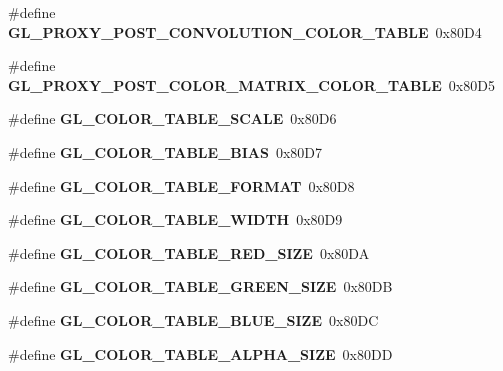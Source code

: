\begin{DoxyCompactItemize}
\item 
\#define {\bfseries G\+L\+\_\+\+P\+R\+O\+X\+Y\+\_\+\+P\+O\+S\+T\+\_\+\+C\+O\+N\+V\+O\+L\+U\+T\+I\+O\+N\+\_\+\+C\+O\+L\+O\+R\+\_\+\+T\+A\+B\+L\+E}~0x80\+D4\label{_s_d_l__opengl_8h_aea3b3835746e512db9dd4d8faa53802d}

\item 
\#define {\bfseries G\+L\+\_\+\+P\+R\+O\+X\+Y\+\_\+\+P\+O\+S\+T\+\_\+\+C\+O\+L\+O\+R\+\_\+\+M\+A\+T\+R\+I\+X\+\_\+\+C\+O\+L\+O\+R\+\_\+\+T\+A\+B\+L\+E}~0x80\+D5\label{_s_d_l__opengl_8h_a1fd5301bba01002fbdc77099780c6e56}

\item 
\#define {\bfseries G\+L\+\_\+\+C\+O\+L\+O\+R\+\_\+\+T\+A\+B\+L\+E\+\_\+\+S\+C\+A\+L\+E}~0x80\+D6\label{_s_d_l__opengl_8h_aec92579e9017715501644fa75665b1b2}

\item 
\#define {\bfseries G\+L\+\_\+\+C\+O\+L\+O\+R\+\_\+\+T\+A\+B\+L\+E\+\_\+\+B\+I\+A\+S}~0x80\+D7\label{_s_d_l__opengl_8h_a32cd65a4ace7f64260fbec54c818d3db}

\item 
\#define {\bfseries G\+L\+\_\+\+C\+O\+L\+O\+R\+\_\+\+T\+A\+B\+L\+E\+\_\+\+F\+O\+R\+M\+A\+T}~0x80\+D8\label{_s_d_l__opengl_8h_a9e3a3ded630592037491f0c62fd8a381}

\item 
\#define {\bfseries G\+L\+\_\+\+C\+O\+L\+O\+R\+\_\+\+T\+A\+B\+L\+E\+\_\+\+W\+I\+D\+T\+H}~0x80\+D9\label{_s_d_l__opengl_8h_a55444a6503044558791cb85d4e9b100c}

\item 
\#define {\bfseries G\+L\+\_\+\+C\+O\+L\+O\+R\+\_\+\+T\+A\+B\+L\+E\+\_\+\+R\+E\+D\+\_\+\+S\+I\+Z\+E}~0x80\+D\+A\label{_s_d_l__opengl_8h_a8afb15e935de90877c7e3eefdd28c133}

\item 
\#define {\bfseries G\+L\+\_\+\+C\+O\+L\+O\+R\+\_\+\+T\+A\+B\+L\+E\+\_\+\+G\+R\+E\+E\+N\+\_\+\+S\+I\+Z\+E}~0x80\+D\+B\label{_s_d_l__opengl_8h_a5a9954d296cfbdee62b745eda2bca3b0}

\item 
\#define {\bfseries G\+L\+\_\+\+C\+O\+L\+O\+R\+\_\+\+T\+A\+B\+L\+E\+\_\+\+B\+L\+U\+E\+\_\+\+S\+I\+Z\+E}~0x80\+D\+C\label{_s_d_l__opengl_8h_ae8e8734ba40b80cfe017c1a961093a3f}

\item 
\#define {\bfseries G\+L\+\_\+\+C\+O\+L\+O\+R\+\_\+\+T\+A\+B\+L\+E\+\_\+\+A\+L\+P\+H\+A\+\_\+\+S\+I\+Z\+E}~0x80\+D\+D\label{_s_d_l__opengl_8h_a1471c5feb1934db1bf576fc60c6e97e7}


\end{DoxyCompactItemize}
